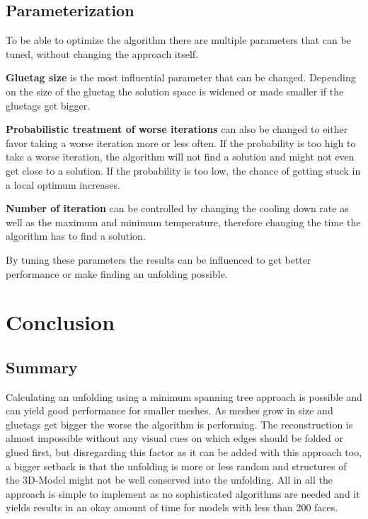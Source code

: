 \documentclass[draft,final]{vutinfth} %
\begin{document}
\section{Parameterization}

To be able to optimize the algorithm there are multiple parameters that can be tuned, without changing the approach itself.

\textbf{Gluetag size} is the most influential parameter that can be changed. Depending on the size of the gluetag the solution space is widened or made smaller if the gluetags get bigger.

\textbf{Probabilistic treatment of worse iterations} can also be changed to either favor taking a worse iteration more or less often. If the probability is too high to take a worse iteration, the algorithm will not find a solution and might not even get close to a solution. If the probability is too low, the chance of getting stuck in a local optimum increases.

\textbf{Number of iteration} can be controlled by changing the cooling down rate as well as the maximum and minimum temperature, therefore changing the time the algorithm has to find a solution.

By tuning these parameters the results can be influenced to get better performance or make finding an unfolding possible.

\chapter{Conclusion}
\label{chap:conclusion}

\section{Summary}
Calculating an unfolding using a minimum spanning tree approach is possible and can yield good performance for smaller meshes. As meshes grow in size and gluetags get bigger the worse the algorithm is performing. The reconstruction is almost impossible without any visual cues on which edges should be folded or glued first, but disregarding this factor as it can be added with this approach too, a bigger setback is that the unfolding is more or less random and structures of the 3D-Model might not be well conserved into the unfolding. All in all the approach is simple to implement as no sophisticated algorithms are needed and it yields results in an okay amount of time for models with less than 200 faces.
\end{document}
